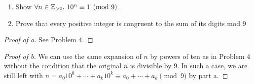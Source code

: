 \documentclass[../hw1]{subfiles}
\begin{document}
\begin{problem}[10]
\begin{enumerate}[label=\alph*)]
	\item Show $\forall n \in \mathbb{Z}_{>0},\, 10^n\equiv 1 \pmod{9}$.
	\item Prove that every positive integer is congruent to the sum of its digits mod
	      9
\end{enumerate}
\end{problem}
\begin{proof}[Proof of a]
	See Problem 4.
\end{proof}
\begin{proof}[Proof of b]
	We can use the same expansion of $n$ by powers of ten as in Problem 4 without the condition that the original $n$ is divisible by 9.
	In such a case, we are still left with $n = a_0 10^0 + \cdots + a_k 10^k \equiv a_0 + \cdots + a_k \pmod{9}$ by part a.
\end{proof}
\end{document}
